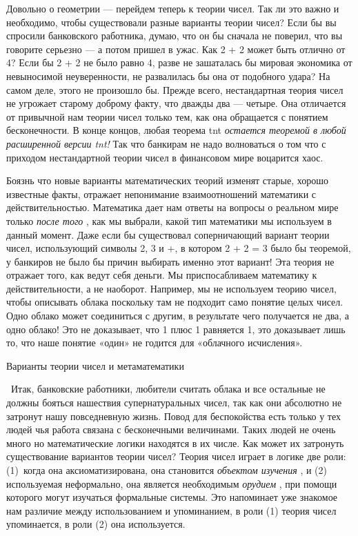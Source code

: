\documentclass[../main.tex]{subfiles}
\begin{document}
Довольно о геометрии --- перейдем теперь к теории чисел. Так ли это важно и необходимо, чтобы существовали разные варианты теории чисел? Если бы вы спросили банковского работника, думаю, что он бы сначала не поверил, что вы говорите серьезно --- а потом пришел в ужас. Как 2 + 2 может быть отлично от 4? Если бы 2 + 2 не было равно 4, разве не зашаталась бы мировая экономика от невыносимой неуверенности, не развалилась бы она от подобного удара? На самом деле, этого не произошло бы. Прежде всего, нестандартная теория чисел не угрожает старому доброму факту, что дважды два --- четыре. Она отличается от привычной нам теории чисел только тем, как она обращается с понятием бесконечности. В конце концов, любая теорема \acs{tnt} \emph{остается теоремой в любой расширенной версии \acs{tnt}!} Так что банкирам не надо волноваться о том что с приходом нестандартной теории чисел в финансовом мире воцарится хаос.

Боязнь что новые варианты математических теорий изменят старые, хорошо известные факты, отражает непонимание взаимоотношений математики с действительностью. Математика дает нам ответы на вопросы о реальном мире только \emph{после того} , как мы выбрали, какой тип математики мы используем в данный момент. Даже если бы существовал соперничающий вариант теории чисел, использующий символы 2, 3 и +, в котором 2 + 2 = 3 было бы теоремой, у банкиров не было бы причин выбирать именно этот вариант! Эта теория не отражает того, как ведут себя деньги. Мы приспосабливаем математику к действительности, а не наоборот. Например, мы не используем теорию чисел, чтобы описывать облака поскольку там не подходит само понятие целых чисел. Одно облако может соединиться с другим, в результате чего получается не два, а одно облако! Это не доказывает, что 1 плюс 1 равняется 1, это доказывает лишь то, что наше понятие «один» не годится для «облачного исчисления».

Варианты теории чисел и метаматематики

~Итак, банковские работники, любители считать облака и все остальные не должны бояться нашествия супернатуральных чисел, так как они абсолютно не затронут нашу повседневную жизнь. Повод для беспокойства есть только у тех людей чья работа связана с бесконечными величинами. Таких людей не очень много но математические логики находятся в их числе. Как может их затронуть существование вариантов теории чисел? Теория чисел играет в логике две роли: (1)~когда она аксиоматизирована, она становится \emph{объектом изучения} , и (2) используемая неформально, она является необходимым \emph{орудием} , при помощи которого могут изучаться формальные системы. Это напоминает уже знакомое нам различие между использованием и упоминанием, в роли (1) теория чисел упоминается, в роли (2) она используется.
\end{document}

